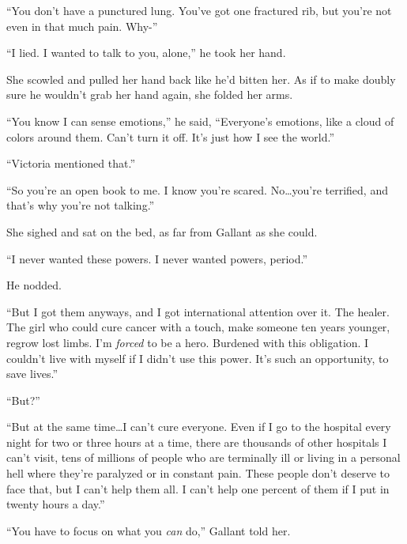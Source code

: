 ``You don't have a punctured lung.  You've got one fractured rib, but you're not even in that much pain.  Why-''



``I lied.  I wanted to talk to you, alone,'' he took her hand.



She scowled and pulled her hand back like he'd bitten her.  As if to make doubly sure he wouldn't grab her hand again, she folded her arms.



``You know I can sense emotions,'' he said, ``Everyone's emotions, like a cloud of colors around them.  Can't turn it off.  It's just how I see the world.''



``Victoria mentioned that.''



``So you're an open book to me.  I know you're scared.  No\ldots you're terrified, and that's why you're not talking.''



She sighed and sat on the bed, as far from Gallant as she could.



``I never wanted these powers.  I never wanted powers, period.''



He nodded.



``But I got them anyways, and I got international attention over it.  The healer.  The girl who could cure cancer with a touch, make someone ten years younger, regrow lost limbs.  I'm \emph{forced} to be a hero.  Burdened with this obligation.  I couldn't live with myself if I didn't use this power.  It's such an opportunity, to save lives.''



``But?''



``But at the same time\ldots I can't cure everyone.  Even if I go to the hospital every night for two or three hours at a time, there are thousands of other hospitals I can't visit, tens of millions of people who are terminally ill or living in a personal hell where they're paralyzed or in constant pain.  These people don't deserve to face that, but I can't help them all.  I can't help one percent of them if I put in twenty hours a day.''



``You have to focus on what you \emph{can} do,'' Gallant told her.



